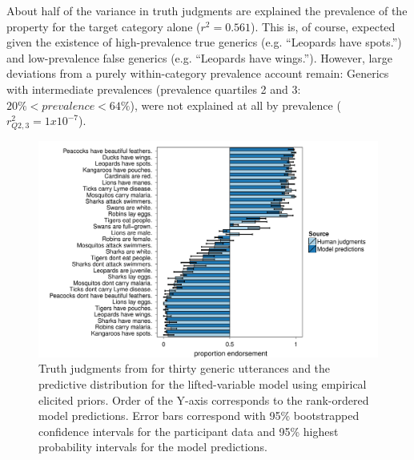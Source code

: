 \documentclass[10pt,letterpaper]{article}
\begin{document}
About half of the variance in truth judgments are explained the prevalence of the property for the target category alone ($r^2 = 0.561$). 
This is, of course, expected given the existence of high-prevalence true generics (e.g. ``Leopards have spots.'') and low-prevalence false generics (e.g. ``Leopards have wings.''). 
However, large deviations from a purely within-category prevalence account remain: Generics with intermediate prevalences (prevalence quartiles 2 and 3: $ 20\% < prevalence < 64\%$), were not explained at all by prevalence ($r_{Q2,3}^2 = 1 x 10^{-7}$).

\begin{figure}
\centering
    \includegraphics[width=\columnwidth]{tj_n100-postPred-byItem.pdf}
    \caption{Truth judgments from for thirty generic utterances and the predictive distribution for the lifted-variable model using empirical elicited priors. Order of the Y-axis corresponds to the rank-ordered model predictions. Error bars correspond with 95\% bootstrapped confidence intervals for the participant data and 95\% highest probability intervals for the model predictions.}
  \label{fig:modeldataBars}
\end{figure}

\end{document}
